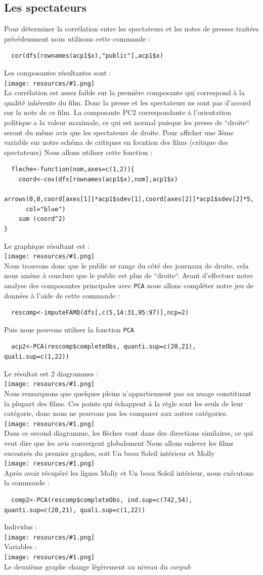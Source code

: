 \documentclass{report}
\newcommand{\photo}[1]{\\
    \texttt{[image: resources/\#1.png]}
\\
}
\begin{document}
\subsection{Les spectateurs}
Pour déterminer la corrélation entre les spectateurs et les notes de presses traitées précédemment nous utilisons
cette commande :
\begin{verbatim}
  cor(dfs[rownames(acp1$x),"public"],acp1$x)
\end{verbatim}
Les composantes résultantes sont :
\photo{14}
La corrélation est assez faible sur la première composante qui correspond à la qualité inhérente du film.
Donc la presse et les spectateurs ne sont pas d'accord sur la note de ce film. La composante PC2 correspondante
à l'orientation politique a la valeur maximale, ce qui est normal puisque les presse de ``droite`` seront
du même avis que les spectateurs de droite.
Pour afficher une 3ème variable sur notre schéma de critiques en focntion des films (critique des spectateurs)
Nous allons utiliser cette fonction :
\begin{verbatim}
  fleche<-function(nom,axes=c(1,2)){
    coord<-cov(dfs[rownames(acp1$x),nom],acp1$x)
    arrows(0,0,coord[axes[1]]*acp1$sdev[1],coord[axes[2]]*acp1$sdev[2]*5,
      col="blue")
    sum (coord^2)
}
\end{verbatim}
Le graphique résultant est :
\photo{15}
Nous trouvons donc que le public se range du côté des journaux de droite, cela nous amène à conclure
que le public est plus de ``droite``.
Avant d'effectuer notre analyse des composantes principales avec \texttt{PCA} nous allons compléter notre
jeu de données à l'aide de cette commande :
\begin{verbatim}
  rescomp<-imputeFAMD(dfs[,c(5,14:31,95:97)],ncp=2)
\end{verbatim}
Puis nous pouvons utiliser la fonction \texttt{PCA}
\begin{verbatim}
  acp2<-PCA(rescomp$completeObs, quanti.sup=c(20,21), quali.sup=c(1,22))
\end{verbatim}
Le résultat est 2 diagrammes :
\photo{17}
Nous remarquons que quelques pleins n'appartiennent pas au nuage constituant la plupart des films.
Ces points qui échappent à la règle sont les seuls de leur catégorie, donc nous ne pouvons pas
les comparer aux autres catégories.
\photo{18}
Dans ce second diagramme, les flèches vont dans des directions similaires, ce qui veut dire que
les avis convergent globalement
Nous allons enlever les films excentrés du premier graphes, soit Un beau Soleil intérieur et Molly
\photo{19}
Après avoir récupéré les lignes Molly et Un beau Soleil intérieur, nous exécutons la commande :
\begin{verbatim}
  comp2<-PCA(rescomp$completeObs, ind.sup=c(742,54), quanti.sup=c(20,21), quali.sup=c(1,22))
\end{verbatim}
Individus :
\photo{191}
Variables : 
\photo{192}
Le deuxième graphe change légèrement au niveau du \textit{varpub}
\newpage
\end{document}
